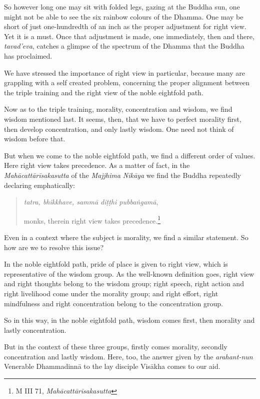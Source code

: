 So however long one may sit with folded legs, gazing at the Buddha sun, one might not be able to see the six rainbow colours of the Dhamma. One may be short of just one-hundredth of an inch as the proper adjustment for right view. Yet it is a must. Once that adjustment is made, one immediately, then and there, \emph{tavad'eva}, catches a glimpse of the spectrum of the Dhamma that the Buddha has proclaimed.

We have stressed the importance of right view in particular, because many are grappling with a self created problem, concerning the proper alignment between the triple training and the right view of the noble eightfold path.

Now as to the triple training, morality, concentration and wisdom, we find wisdom mentioned last. It seems, then, that we have to perfect morality first, then develop concentration, and only lastly wisdom. One need not think of wisdom before that.

But when we come to the noble eightfold path, we find a different order of values. Here right view takes precedence. As a matter of fact, in the \emph{Mahācattārīsakasutta} of the \emph{Majjhima Nikāya} we find the Buddha repeatedly declaring emphatically:

\begin{quote}
\emph{tatra, bhikkhave, sammā diṭṭhi pubbaṅgamā},

monks, therein right view takes precedence.\footnote{M III 71, \emph{Mahācattārīsakasutta}}
\end{quote}

Even in a context where the subject is morality, we find a similar statement. So how are we to resolve this issue?

In the noble eightfold path, pride of place is given to right view, which is representative of the wisdom group. As the well-known definition goes, right view and right thoughts belong to the wisdom group; right speech, right action and right livelihood come under the morality group; and right effort, right mindfulness and right concentration belong to the concentration group.

So in this way, in the noble eightfold path, wisdom comes first, then morality and lastly concentration.

But in the context of these three groups, firstly comes morality, secondly concentration and lastly wisdom. Here, too, the answer given by the \emph{arahant-nun} Venerable Dhammadinnā to the lay disciple Visākha comes to our aid.

